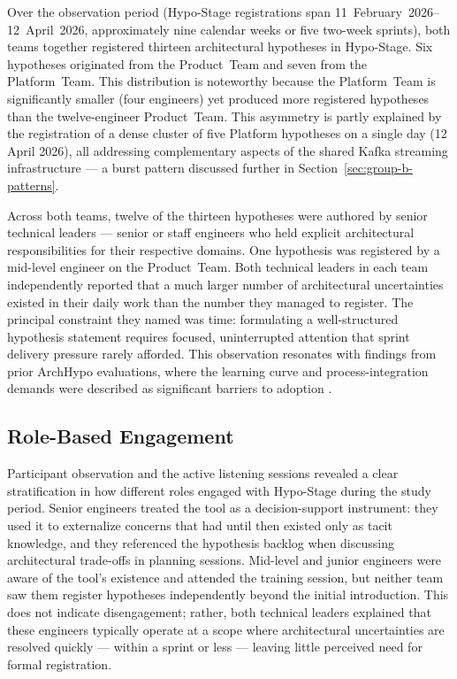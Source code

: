 Over the observation period (Hypo-Stage registrations span 11~February~2026--12~April~2026, approximately nine calendar weeks or five two-week sprints), both teams together registered thirteen
architectural hypotheses in Hypo-Stage. Six hypotheses originated from the
Product~Team and seven from the Platform~Team. This distribution is noteworthy
because the Platform~Team is significantly smaller (four engineers) yet produced
more registered hypotheses than the twelve-engineer Product~Team. This asymmetry
is partly explained by the registration of a dense cluster of five Platform
hypotheses on a single day (12 April 2026), all addressing complementary aspects
of the shared Kafka streaming infrastructure — a burst pattern discussed further
in Section~\ref{sec:group-b-patterns}.

Across both teams, twelve of the thirteen hypotheses were authored by senior
technical leaders — senior or staff engineers who held explicit architectural
responsibilities for their respective domains. One hypothesis was registered by a
mid-level engineer on the Product~Team. Both technical leaders in each team
independently reported that a much larger number of architectural uncertainties
existed in their daily work than the number they managed to register. The
principal constraint they named was time: formulating a well-structured hypothesis
statement requires focused, uninterrupted attention that sprint delivery
pressure rarely afforded. This observation resonates with findings from prior
ArchHypo evaluations, where the learning curve and process-integration demands
were described as significant barriers to adoption
\citep{silva2024tse, silva2024ieeesw}.

\subsection{Role-Based Engagement}
\label{subsec:role-engagement}

Participant observation and the active listening sessions revealed a clear
stratification in how different roles engaged with Hypo-Stage during the study
period. Senior engineers treated the tool as a decision-support instrument:
they used it to externalize concerns that had until then existed only as tacit
knowledge, and they referenced the hypothesis backlog when discussing
architectural trade-offs in planning sessions. Mid-level and junior engineers
were aware of the tool's existence and attended the training session, but
neither team saw them register hypotheses independently beyond the initial
introduction. This does not indicate disengagement; rather, both technical
leaders explained that these engineers typically operate at a scope where
architectural uncertainties are resolved quickly — within a sprint or less —
leaving little perceived need for formal registration.

